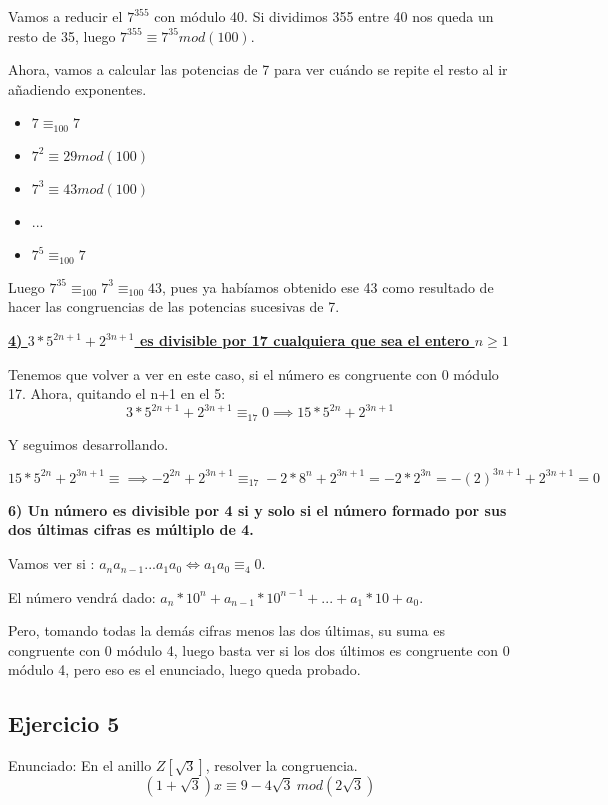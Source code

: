 \documentclass[11pt, a4paper, titlepage]{article}
\begin{document}
Vamos a reducir el $7^{355}$ con módulo 40. Si dividimos 355 entre 40 nos queda un resto de 35, luego $7^{355} \equiv 7^{35} mod(100)$.

Ahora, vamos a calcular las potencias de 7 para ver cuándo se repite el resto al ir añadiendo exponentes.
\begin{itemize}
	\item $7 \equiv_{100} 7$
	\item $7^2 \equiv 29 mod(100)$
	\item $7^3 \equiv 43 mod(100)$
	\item ...
	\item $7^5 \equiv_{100} 7$
\end{itemize}

Luego $7^{35} \equiv_{100} 7^3 \equiv_{100} 43$, pues ya habíamos obtenido ese 43 como resultado de hacer las congruencias de las potencias sucesivas de 7.


\underline{\textbf{4) $3*5^{2n+1} + 2^{3n+1}$ es divisible por 17 cualquiera que sea el entero $n\geq 1$}}

Tenemos que volver a ver en este caso, si el número es congruente con 0 módulo 17.
Ahora, quitando el n+1 en el 5:
\[
3*5^{2n+1} + 2^{3n+1} \equiv_{17} 0  \implies 15*5^{2n} + 2^{3n+1}
\]

Y seguimos desarrollando.

\[
 15*5^{2n} + 2^{3n+1} \equiv  \implies -2^{2n} + 2^{3n+1} \equiv_{17} -2*8^n + 2^{3n+1} = -2*2^{3n} = -(2)^{3n+1} + 2^{3n+1} = 0
\]

\textbf{6) Un número es divisible por 4 si y solo si el número formado por sus dos
últimas cifras es múltiplo de 4.}

Vamos ver si : $a_n a_{n-1}...a_1a_0 \iff a_1 a_0 \equiv_4 0$.

El número vendrá dado: $a_n*10^{n}+ a_{n-1}*10^{n-1} + ... + a_1 * 10 + a_0$.

Pero, tomando todas la demás cifras menos las dos últimas, su suma es congruente con 0 módulo 4, luego  basta ver si los dos últimos es congruente con 0 módulo 4, pero eso es el enunciado, luego queda probado.


\subsection{\LARGE{Ejercicio 5}}

Enunciado: En el anillo $Z[\sqrt3]$, resolver la congruencia.
$$ (1+ \sqrt3)x \equiv 9 - 4\sqrt3 \ mod(2\sqrt3)$$
\end{document}
